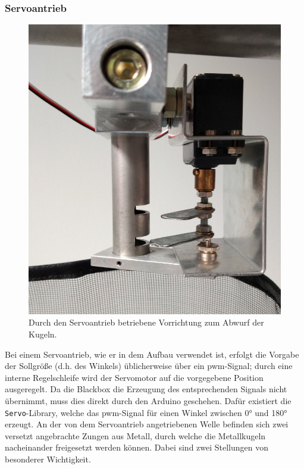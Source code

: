\documentclass{kis}
\begin{document}
\subsubsection{Servoantrieb}
\begin{figure}
	\raggedleft
	\vspace*{-0.5\baselineskip}
	\includegraphics[width=0.9\linewidth]{IMG_20200525_171143701.jpg}
	\caption[Vorrichtung zum Abwurf der Kugeln]{Durch den Servoantrieb betriebene Vorrichtung zum Abwurf der Kugeln.}
\end{figure}
Bei einem Servoantrieb, wie er in dem Aufbau verwendet ist, erfolgt die Vorgabe der Sollgröße (d.h. des Winkels) üblicherweise über ein \gls{pwm}-Signal; durch eine interne Regelschleife wird der Servomotor auf die vorgegebene Position ausgeregelt. Da die Blackbox die Erzeugung des entsprechenden Signals nicht übernimmt, muss dies direkt durch den Arduino geschehen. Dafür existiert die \texttt{Servo}-Library, welche das \gls{pwm}-Signal für einen Winkel zwischen 0° und 180° erzeugt.
An der von dem Servoantrieb angetriebenen Welle befinden sich zwei versetzt angebrachte Zungen aus Metall, durch welche die Metallkugeln nacheinander freigesetzt werden können. Dabei sind zwei Stellungen von besonderer Wichtigkeit.
\end{document}
